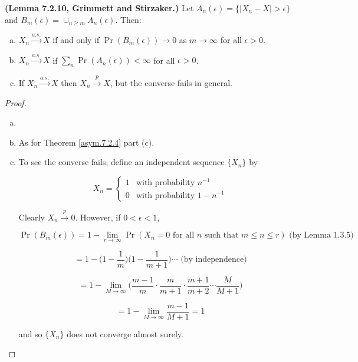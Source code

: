 \begin{lemma}\label{asym.7.2.10}
\textbf{(Lemma 7.2.10, Grimmett and Stirzaker.)} Let \(A_n(\epsilon) = \{|X_n - X| > \epsilon \}\) and \(B_m(\epsilon) = \cup_{n \geq m} A_n(\epsilon)\). Then:

\begin{enumerate}[(a)]

\item \(X_n \xrightarrow{a.s.} X\) if and only if \(\Pr(B_m(\epsilon)) \to 0\) as \(m \to \infty\) for all \(\epsilon > 0\).

\item \(X_n \xrightarrow{a.s.} X\) if \(\sum_n \Pr(A_n(\epsilon)) < \infty\) for all \(\epsilon > 0\).

\item If \(X_n \xrightarrow{a.s.} X\) then \(X_n \xrightarrow{p} X\), but the converse fails in general.

\end{enumerate}
\end{lemma}
\begin{proof}\begin{enumerate}[(a)]

\item

\item As for Theorem \ref{asym.7.2.4} part (c).

\item To see the converse fails, define an independent sequence \(\{X_n\}\) by

\[
X_n = \begin{cases}
1 & \text{with probability } n^{-1} \\
0 & \text{with probability } 1 - n^{-1}
\end{cases}
\]

Clearly \(X_n \xrightarrow{p} 0\). However, if \(0 < \epsilon < 1\),

\[
\Pr(B_m(\epsilon)) = 1 - \lim_{r \to \infty} \Pr(X_n = 0 \text{ for all } n \text{ such that } m \leq n \leq r) \text{ (by Lemma 1.3.5)}
\]

\[
=1 - \bigg( 1 - \frac{1}{m} \bigg)\bigg(1 - \frac{1}{m+1} \bigg) \cdots \text{ (by independence)}
\]

\[
= 1 - \lim_{M \to \infty}\bigg( \frac{m-1}{m} \cdot \frac{m}{m+1} \cdot \frac{m+1}{m+2} \cdots \frac{M}{M +1} \bigg)
\]

\[
= 1 - \lim_{M \to \infty} \frac{m-1}{M +1} = 1
\]

and so \(\{X_n\}\) does not converge almost surely.

\end{enumerate}\end{proof}

